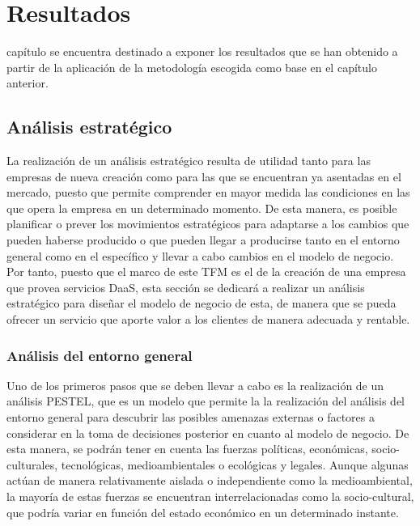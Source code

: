 \chapter{Resultados}
\label{chap:resultados}

 capítulo se encuentra destinado a exponer los resultados que se han obtenido a partir de la aplicación de la metodología escogida como base en el capítulo anterior.

\section{Análisis estratégico}
La realización de un análisis estratégico resulta de utilidad tanto para las empresas de nueva creación como para las que se encuentran ya asentadas en el mercado, puesto que permite comprender en mayor medida las condiciones en las que opera la empresa en un determinado momento. De esta manera, es posible planificar o prever los movimientos estratégicos para adaptarse a los cambios que pueden haberse producido o que pueden llegar a producirse tanto en el entorno general como en el específico y llevar a cabo cambios en el modelo de negocio. Por tanto, puesto que el marco de este \acs{TFM} es el de la creación de una empresa que provea servicios \acs{DaaS}, esta sección se dedicará a realizar un análisis estratégico para diseñar el modelo de negocio de esta, de manera que se pueda ofrecer un servicio que aporte valor a los clientes de manera adecuada y rentable.

\subsection{Análisis del entorno general}
Uno de los primeros pasos que se deben llevar a cabo es la realización de un análisis PESTEL, que es un modelo que permite la la realización del análisis del entorno general para descubrir las posibles amenazas externas o factores a considerar en la toma de decisiones posterior en cuanto al modelo de negocio. De esta manera, se podrán tener en cuenta las fuerzas políticas, económicas, socio-culturales, tecnológicas, medioambientales o ecológicas y legales. Aunque algunas actúan de manera relativamente aislada o independiente como la medioambiental, la mayoría de estas fuerzas se encuentran interrelacionadas como la socio-cultural, que podría variar en función del estado económico en un determinado instante.

\clearpage

